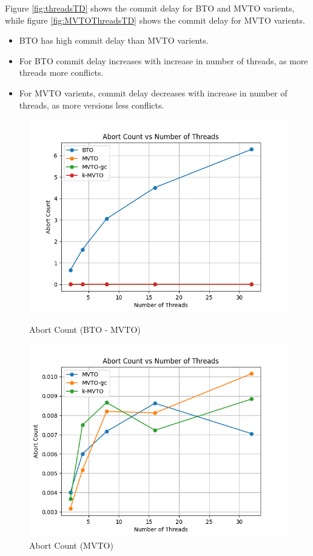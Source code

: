 \documentclass[12pt]{article}
\begin{document}
Figure \ref{fig:threadsTD} shows the commit delay for BTO and MVTO varients, while figure \ref{fig:MVTOThreadsTD} shows the commit delay for MVTO varients.
\begin{itemize}
    \item BTO has high commit delay than MVTO varients.
    \item For BTO commit delay increases with increase in number of threads, as more threads more conflicts.
    \item For MVTO varients, commit delay decreases with increase in number of threads, as more versions less conflicts.
\end{itemize}
\begin{figure}[h]
    \centering
    \begin{minipage}[b]{0.45\textwidth}
        \includegraphics[width=\textwidth]{./images/ThreadsAC.png}
        \caption{Abort Count (BTO - MVTO)}
        \label{fig:threadsAC}
    \end{minipage}
    \hfill
    \begin{minipage}[b]{0.45\textwidth}
        \includegraphics[width=\textwidth]{./images/MVTOThreadsAC.png}
        \caption{Abort Count (MVTO)}
        \label{fig:MVTOThreadsAC}
    \end{minipage}
\end{figure}
\end{document}
